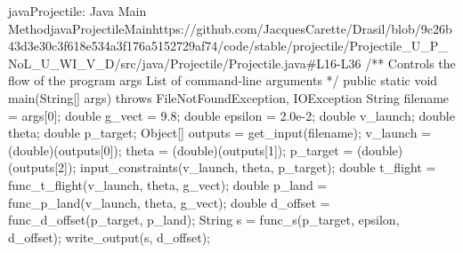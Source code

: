 \begin{codeSnippet}{java}{Projectile: Java Main Method}{javaProjectileMain}{https://github.com/JacquesCarette/Drasil/blob/9c26b43d3e30c3f618e534a3f176a5152729af74/code/stable/projectile/Projectile_U_P_NoL_U_WI_V_D/src/java/Projectile/Projectile.java\#L16-L36}
/** \brief Controls the flow of the program
    \param args List of command-line arguments
*/
public static void main(String[] args) throws FileNotFoundException, IOException {
    String filename = args[0];
    double g_vect = 9.8;
    double epsilon = 2.0e-2;
    double v_launch;
    double theta;
    double p_target;
    Object[] outputs = get_input(filename);
    v_launch = (double)(outputs[0]);
    theta = (double)(outputs[1]);
    p_target = (double)(outputs[2]);
    input_constraints(v_launch, theta, p_target);
    double t_flight = func_t_flight(v_launch, theta, g_vect);
    double p_land = func_p_land(v_launch, theta, g_vect);
    double d_offset = func_d_offset(p_target, p_land);
    String s = func_s(p_target, epsilon, d_offset);
    write_output(s, d_offset);
}
\end{codeSnippet}
